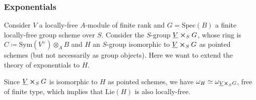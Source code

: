 \subsubsection{Exponentials}
Consider $V$ a locally-free $A$-module of finite rank
and $G = \mathrm{Spec}(B)$ a finite locally-free 
group scheme over $S$.
Consider the $S$-group $\underline{V} \cross_{ S } G$, whose ring is
$C \coloneqq \mathrm{Sym}(V^\vee) \otimes_A B$ and $H$ an $S$-group isomorphic
to $\underline{V} \cross_{ S } G$ as pointed schemes (but not necessarily
as group objects).
Here we want to extend the theory of exponentials to $H$.


\begin{rem}[]
	Since $\underline{V} \cross_{ S } G$ is isomorphic to $H$ as pointed
	schemes, we have $\omega_H \simeq \omega_{\underline{V} \cross_S G}$, free of finite type,
	which implies that $\mathrm{Lie}(H)$ is also locally-free.
\end{rem}


